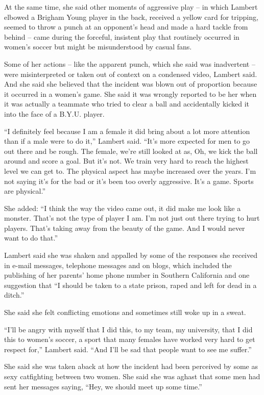 ﻿\documentclass[12pt]{article}
\begin{document}
At the same time, she said other moments of aggressive play -- in which Lambert elbowed a Brigham
Young player in the back, received a yellow card for tripping, seemed to throw a punch at an
opponent's head and made a hard tackle from behind -- came during the forceful, insistent play that
routinely occurred in women's soccer but might be misunderstood by casual fans.

Some of her actions -- like the apparent punch, which she said was inadvertent -- were
misinterpreted or taken out of context on a condensed video, Lambert said. And she said she believed
that the incident was blown out of proportion because it occurred in a women's game. She said it was
wrongly reported to be her when it was actually a teammate who tried to clear a ball and
accidentally kicked it into the face of a B.Y.U. player.

``I definitely feel because I am a female it did bring about a lot more attention than if a male
were to do it,'' Lambert said. ``It's more expected for men to go out there and be rough. The
female, we're still looked at as, Oh, we kick the ball around and score a goal. But it's not. We
train very hard to reach the highest level we can get to. The physical aspect has maybe increased
over the years. I'm not saying it's for the bad or it's been too overly aggressive. It's a game.
Sports are physical.''

She added: ``I think the way the video came out, it did make me look like a monster. That's not the
type of player I am. I'm not just out there trying to hurt players. That's taking away from the
beauty of the game. And I would never want to do that.''

Lambert said she was shaken and appalled by some of the responses she received in e-mail messages,
telephone messages and on blogs, which included the publishing of her parents' home phone number in
Southern California and one suggestion that ``I should be taken to a state prison, raped and left
for dead in a ditch.''

She said she felt conflicting emotions and sometimes still woke up in a sweat.

``I'll be angry with myself that I did this, to my team, my university, that I did this to women's
soccer, a sport that many females have worked very hard to get respect for,'' Lambert said. ``And
I'll be sad that people want to see me suffer.''

She said she was taken aback at how the incident had been perceived by some as sexy catfighting
between two women. She said she was aghast that some men had sent her messages saying, ``Hey, we
should meet up some time.''
\end{document}
